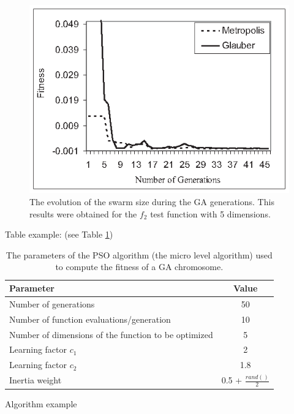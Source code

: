 \documentclass[runningheads,a4paper,11pt]{report}
\begin{document}
\begin{figure}[htbp]
	\centerline{\includegraphics{Fig/FitEvol.eps}}  
	\caption{The evolution of the swarm size during the GA generations. This results were obtained for the $f_2$ test function with 5 dimensions.}
	\label{swarmsize}
\end{figure}


Table example: (see Table \ref{tab3PSO})


\begin{table}[htbp]
	\caption{The parameters of the PSO algorithm (the micro level algorithm) used to compute the fitness of a GA chromosome.}
	\label{tab3PSO}
		\begin{center}
			\begin{tabular}{p{220pt}c}

				\textbf{Parameter}& \textbf{Value} \\
				\hline\hline
 				Number of generations& 50 \\
 				Number of function evaluations/generation& 10 \\
 				Number of dimensions of the function to be optimized& 5 \\
 				Learning factor $c_{1}$& 2 \\
 				Learning factor $c_{2}$ & 1.8\\
 				Inertia weight& 0.5 + $\frac{rand()}{2}$\\
		
			\end{tabular}
		\end{center}
\end{table}

Algorithm example 
\end{document}
